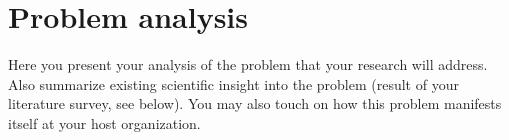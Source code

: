 \section{Problem analysis}

Here you present your analysis of the problem that your research will address. Also summarize existing scientific insight into the problem (result of your literature survey, see below). You may also touch on how this problem manifests itself at your host organization.
